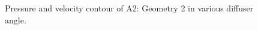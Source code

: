 \begin{figure}[]
    \noindent{}
    \caption{Pressure and velocity contour of A2: Geometry 2 in various diffuser angle.}
    \label{fig:2D_OF_A2_CONTOUR}
\end{figure}


\begin{figure}[]
    \noindent{}  
    \label{fig:2D_OF_A3_Contour1}
\end{figure}

